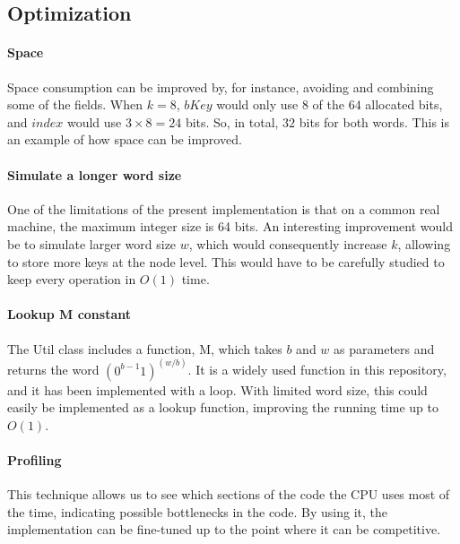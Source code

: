\subsection{Optimization}

\paragraph*{Space}
Space consumption can be improved by, for instance, avoiding and combining some of the fields. When $k = 8$, $bKey$ would only use $8$ of the $64$ allocated bits, and $index$ would use $3 \times 8 = 24$ bits. So, in total, $32$ bits for both words. This is an example of how space can be improved.

\paragraph*{Simulate a longer word size}
One of the limitations of the present implementation is that on a common real machine, the maximum integer size is 64 bits. An interesting improvement would be to simulate larger word size $w$, which would consequently increase $k$, allowing to store more keys at the node level. This would have to be carefully studied to keep every operation in $O(1)$ time.


\paragraph*{Lookup {\ttfamily M} constant}
The {\ttfamily Util} class includes a function, {\ttfamily M}, which takes $b$ and $w$ as parameters and returns the word $(0^{b-1}1)^{(w/b)}$. It is a widely used function in this repository, and it has been implemented with a loop. With limited word size, this could easily be implemented as a lookup function, improving the running time up to $O(1)$.

\paragraph*{Profiling}
This technique allows us to see which sections of the code the CPU uses most of the time, indicating possible bottlenecks in the code. By using it, the implementation can be fine-tuned up to the point where it can be competitive.